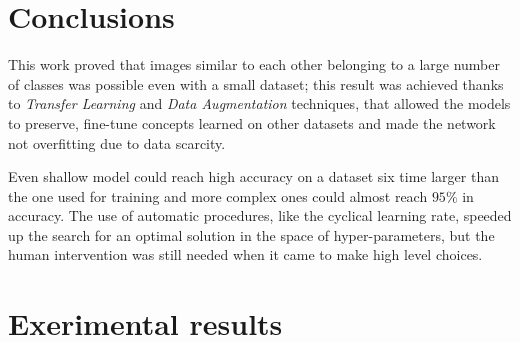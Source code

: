 \section{Conclusions}
This work proved that images similar to each other belonging to a large number of classes was possible even with a small dataset; this result was achieved thanks to \textit{Transfer Learning} and \textit{Data Augmentation} techniques, that allowed the models to preserve, fine-tune concepts learned on other datasets and made the network not overfitting due to data scarcity. \par
Even shallow model could reach high accuracy on a dataset six time larger than the one used for training and more complex ones could almost reach $95\%$ in accuracy. The use of automatic procedures, like the cyclical learning rate, speeded up the search for an optimal solution in the space of hyper-parameters, but the human intervention was still needed when it came to make high level choices.











\newpage
\appendix
\section{Exerimental results}\label{sec:app}


